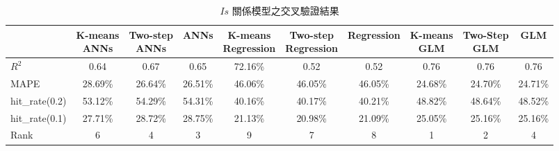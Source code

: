 {\renewcommand{\arraystretch}{1.5}
\begin{table}[hbtp]
  \begin{center}
    \caption{$Is$ 關係模型之交叉驗證結果}
    \label{tab:is_result}
    \scriptsize
    \begin{tabular}{l c c c c c c c c c}
      \hline
       & \specialcell{K-means \\ ANNs} & \specialcell{Two-step \\ ANNs} & ANNs & \specialcell{K-means \\ Regression} & \specialcell{Two-step \\ Regression} & Regression & \specialcell{K-means \\ GLM} & \specialcell{Two-Step \\ GLM} & GLM \\
      \hline
       $R^2$          & 0.64 & 0.67 & 0.65 & 72.16\% & 0.52 & 0.52 & 0.76 & 0.76 & 0.76 \\
       MAPE           & 28.69\% & 26.64\% & 26.51\% & 46.06\% & 46.05\% & 46.05\% & 24.68\% & 24.70\% & 24.71\% \\
       hit\_rate(0.2) & 53.12\% & 54.29\% & 54.31\% & 40.16\% & 40.17\% & 40.21\% & 48.82\% & 48.64\% & 48.52\% \\
       hit\_rate(0.1) & 27.71\% & 28.72\% & 28.75\% & 21.13\% & 20.98\% & 21.09\% & 25.05\% & 25.16\% & 25.16\% \\
      \hline
       Rank & 6 & 4 & 3 & 9 & 7 & 8 & 1 & 2 & 4 \\
      \hline
      \end{tabular}
  \end{center}
\end{table}
}

